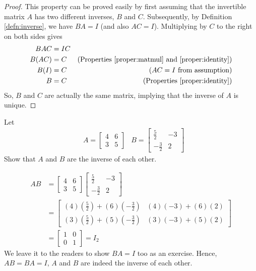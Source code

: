 \begin{proof}
This property can be proved easily by first assuming that the invertible matrix $A$ has two different inverses, $B$ and $C$. Subsequently, by Definition \ref{defn:inverse}, we have $BA = I$ (and also $AC = I$). Multiplying by $C$ to the right on both sides gives
\begin{align*}
BAC &= IC \\
B(AC) &= C & \text{(Properties \ref{proper:matmul} and \ref{proper:identity})}\\
B(I) &= C & \text{($AC = I$ from assumption)} \\
B &= C & \text{(Properties \ref{proper:identity})}
\end{align*}
So, $B$ and $C$ are actually the same matrix, implying that the inverse of $A$ is unique.    
\end{proof}
\begin{exmp}
Let 
\begin{align*}
& A =
\begin{bmatrix}
4 & 6 \\
3 & 5
\end{bmatrix}
& B =
\begin{bmatrix}
\frac{5}{2} & -3 \\
-\frac{3}{2} & 2
\end{bmatrix}
\end{align*}
Show that $A$ and $B$ are the inverse of each other.
\end{exmp}
\begin{solution}
\begin{align*}
AB &= 
\begin{bmatrix}
4 & 6 \\
3 & 5
\end{bmatrix}
\begin{bmatrix}
\frac{5}{2} & -3 \\
-\frac{3}{2} & 2
\end{bmatrix} \\
&= 
\begin{bmatrix}
(4)(\frac{5}{2})+(6)(-\frac{3}{2}) & (4)(-3)+(6)(2) \\
(3)(\frac{5}{2})+(5)(-\frac{3}{2}) & (3)(-3)+(5)(2)
\end{bmatrix} \\
&= 
\begin{bmatrix}
1 & 0 \\
0 & 1
\end{bmatrix} = I_2
\end{align*}
We leave it to the readers to show $BA = I$ too as an exercise. Hence, $AB = BA = I$, $A$ and $B$ are indeed the inverse of each other.
\end{solution}

